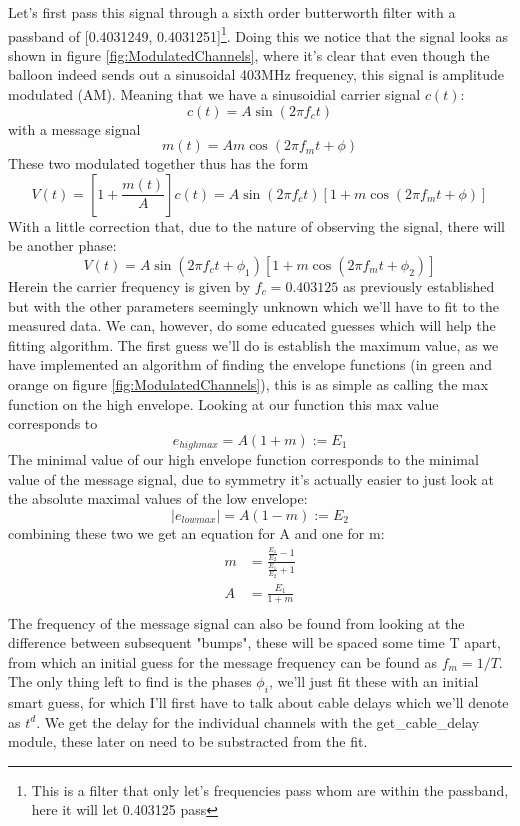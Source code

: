 \documentclass[11pt,a4paper,faculty=we,language=en,doctype=report]{cls/ugent-doc}
\begin{document}
Let's first pass this signal through a sixth order butterworth filter with a
passband of [0.4031249, 0.4031251]\footnote{This is a filter that only let's
frequencies pass whom are within the passband, here it will let 0.403125 pass}. 
Doing this we notice that the signal looks as shown
in figure \ref{fig:ModulatedChannels}, where it's clear that even though the
balloon indeed sends out a sinusoidal 403MHz frequency, this signal is
amplitude modulated (AM).  Meaning that we have a sinusoidial
carrier signal $c(t)$:
\begin{equation}
  c(t) = A \sin(2\pi f_c t)
\end{equation}
with a message signal
\begin{equation}
  m(t) = Am \cos(2\pi f_m t + \phi)
\end{equation}
These two modulated together thus has the form
\begin{equation}
  V(t) = \left[1 + \frac{m(t)}{A}\right]c(t) = A\sin(2\pi f_c t)[1 + m\cos(2\pi f_m  t + \phi)]
\end{equation}
With a little correction that, due to the nature of observing the signal, there will be another phase:
\begin{equation}
  V(t) = A\sin(2\pi f_c t + \phi_1)[1 + m\cos(2\pi f_m  t + \phi_2)]
\end{equation}
Herein the carrier frequency is given by $f_c = 0.403125$ as previously
established but with the other parameters seemingly unknown which we'll have to
fit to the measured data.  We can, however, do some educated guesses which will
help the fitting algorithm.  The first guess we'll do is establish the maximum
value, as we have implemented an algorithm of finding the envelope functions
(in green and orange on figure \ref{fig:ModulatedChannels}), this is as simple
as calling the max function on the high envelope. Looking at our function this
max value corresponds to
\begin{equation}
  e_{highmax} = A(1 + m) := E_1
\end{equation}
The minimal value of our high envelope function corresponds to the minimal value of the message signal, due to symmetry
it's actually easier to just look at the absolute maximal values of the low envelope:
\begin{equation}
  |e_{lowmax}| = A(1-m) := E_2
\end{equation}
combining these two we get an equation for A and one for m:
\begin{align}
  m &= \frac{\frac{E_1}{E_2} - 1}{\frac{E_1}{E_2} + 1}\\
  A &= \frac{E_1}{1+m}\\
\end{align}
The frequency of the message signal can also be found from looking at the
difference between subsequent "bumps", these will be spaced some time T apart,
from which an initial guess for the message frequency can be found as $f_m =
1/T$. The only thing left to find is the phases $\phi_i$, we'll just fit these
with an initial smart guess, for which I'll first have to talk about cable
delays which we'll denote as $t^d$.
We get the delay for the individual channels with the get\_cable\_delay
module, these later on need to be substracted from the fit.
\end{document}
